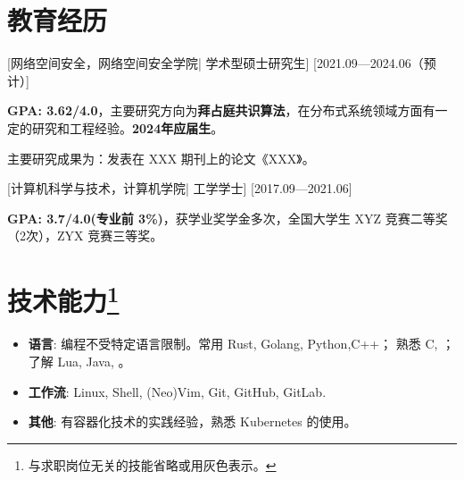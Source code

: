 \documentclass{resume}
\begin{document}


\ResumeTitle


\section{教育经历}
[\textnormal{网络空间安全，网络空间安全学院|}  学术型硕士研究生]
[2021.09—2024.06（预计）]

\textbf{GPA: 3.62/4.0}，主要研究方向为\textbf{拜占庭共识算法}，在分布式系统领域方面有一定的研究和工程经验。\textbf{2024年应届生}。

主要研究成果为：发表在 XXX 期刊上的论文《XXX》。

[\textnormal{计算机科学与技术，计算机学院|} 工学学士]
[2017.09—2021.06]

\textbf{GPA: 3.7/4.0(专业前 3\%)}，获学业奖学金多次，全国大学生 XYZ 竞赛二等奖（2次），ZYX 竞赛三等奖。

\section[技术能力]{技术能力\protect\footnote{与求职岗位无关的技能省略或用灰色表示。}}
\begin{itemize}
  \item \textbf{语言}: 编程不受特定语言限制。常用 Rust, Golang, Python,C++； 熟悉 C, ；了解 Lua, Java, 。
  \item \textbf{工作流}: Linux, Shell, (Neo)Vim, Git, GitHub, GitLab.
  \item \textbf{其他}: 有容器化技术的实践经验，熟悉 Kubernetes 的使用。
\end{itemize}
\end{document}
